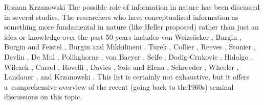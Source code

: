 \begin{artengenv}{Roman Krzanowski}
The possible role of information in nature has been discussed in several studies. The researchers who have conceptualized information as something more fundamental in nature (like Heller proposed) rather than just an idea or knowledge over the past 50 years includes von Weizsäcker 
\parencite*[][]{weizsacker_einheit_1971}, %
 Burgin 
\parencites*[][]{burgin_information_2003}[][]{burgin_theory_2010}[][]{burgin_structural_2017}, %
 Burgin and Feistel 
\parencite*[][]{burgin_structural_2017}, %
 Burgin and Mikkilineni 
\parencite*[][]{burgin_is_2022}, %
 Turek 
\parencites*[][]{turek_filozoficzne_1978}[][]{turek_rozwazania_1981}, %
 Collier 
\parencite*[][]{hanson_intrinsic_1990}, %
 Reeves 
\parencite*[][]{reeves_heure_1986}, %
 Stonier 
\parencite*[][]{stonier_information_1990}, %
 Devlin 
\parencite*[][]{devlin_logic_1991}, %
 De Mul 
\parencite*[][]{mul_informatization_1999}, %
 Polikghorne 
\parencite*[][]{Polkinghorne2000}, %
 von Baeyer 
\parencite*[][]{baeyer_information_2005}, %
 Seife 
\parencite*[][]{seife_decoding_2006}, %
 Dodig-Crnkovic 
\parencite*[][]{dodig-crnkovic_alan_2012}, %
 Hidalgo 
\parencite*[][]{hidalgo_why_2015}, %
 Wilczek 
\parencite*[][]{wilczek_beautiful_2015}, %
 Carrol 
\parencite*[][]{carroll_big_2017}, %
 Rovelli 
\parencite*[][]{rovelli_reality_2016}, %
 Davies 
\parencite*[][]{davies_demon_2019}, %
 Sole and Elena 
\parencite*[][]{sole_viruses_2019}, %
 Schroeder 
\parencites*[][]{schroeder_philosophical_2005}[][]{schroeder_structural_2017}, %
 Wheeler 
\parencite*[][]{wheeler_information_1989}, %
 Landauer 
\parencites*[][]{landauer_irreversibility_1961}[][]{landauer_information_1991}[][]{landauer_physical_1996}, %
 and Krzanowski 
\parencite*[][]{krzanowski_ontological_2022}. %
 This list is certainly not exhaustive, but it offers a~comprehensive overview of the recent (going back to the1960s) seminal discussions on this topic.




\end{artengenv}
